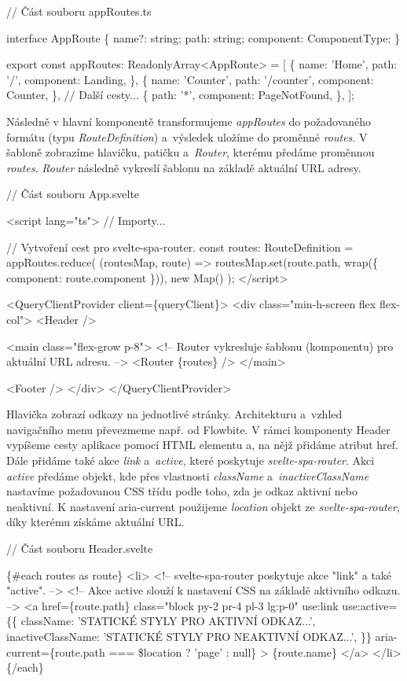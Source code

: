 \begin{prog}
// Část souboru appRoutes.ts

interface AppRoute \{
  name?: string;
  path: string;
  component: ComponentType;
\}

export const appRoutes: ReadonlyArray<AppRoute> = [
  \{
    name: 'Home',
    path: '/',
    component: Landing,
  \},
  \{
    name: 'Counter',
    path: '/counter',
    component: Counter,
  \},
  // Další cesty...
  \{
    path: '*',
    component: PageNotFound,
  \},
];
\end{prog}

Následně v hlavní komponentě transformujeme \emph{appRoutes} do požadovaného formátu (typu \emph{RouteDefinition}) a~výsledek uložíme do proměnné \emph{routes}. 
V šabloně zobrazíme hlavičku, patičku a~\emph{Router}, kterému předáme proměnnou \emph{routes}. 
\emph{Router} následně vykreslí šablonu na základě aktuální URL adresy.

\begin{prog}
// Část souboru App.svelte

<script lang="ts">
  // Importy...

  // Vytvoření cest pro svelte-spa-router.
  const routes: RouteDefinition = appRoutes.reduce(
    (routesMap, route) => routesMap.set(route.path, wrap(\{
      component: route.component
    \})),
    new Map()
  );
</script>

<QueryClientProvider client=\{queryClient\}>
  <div class="min-h-screen flex flex-col">
    <Header />

    <main class="flex-grow p-8">
      <!-- Router vykresluje šablonu (komponentu) pro aktuální URL adresu. -->
      <Router \{routes\} />
    </main>

    <Footer />
  </div>
</QueryClientProvider>
\end{prog}

Hlavička zobrazí odkazy na jednotlivé stránky. Architekturu a~vzhled navigačního menu převezmeme např. od Flowbite. 
V rámci komponenty Header vypíšeme cesty aplikace pomocí HTML elementu a, na nějž přidáme atribut href. 
Dále přidáme také akce \emph{link} a~\emph{active}, které poskytuje \emph{svelte-spa-router}. 
Akci \emph{active} předáme objekt, kde přes vlastnosti \emph{className} a~\emph{inactiveClassName} nastavíme požadovanou CSS třídu podle toho, zda je odkaz aktivní nebo neaktivní. 
K nastavení aria-current použijeme \emph{location} objekt ze \emph{svelte-spa-router}, díky kterému získáme aktuální URL.

\begin{prog}
// Část souboru Header.svelte

\{#each routes as route\}
  <li>
    <!-- svelte-spa-router poskytuje akce "link" a také "active". -->
    <!-- Akce active slouží k nastavení CSS na základě aktivního odkazu. -->
    <a
      href=\{route.path\}
      class="block py-2 pr-4 pl-3 lg:p-0"
      use:link
      use:active=\{\{
        className: 'STATICKÉ STYLY PRO AKTIVNÍ ODKAZ...',
        inactiveClassName: 'STATICKÉ STYLY PRO NEAKTIVNÍ ODKAZ...',
      \}\}
      aria-current=\{route.path === \$location ? 'page' : null\}
    >
      \{route.name\}
    </a>
  </li>
\{/each\}
\end{prog}

